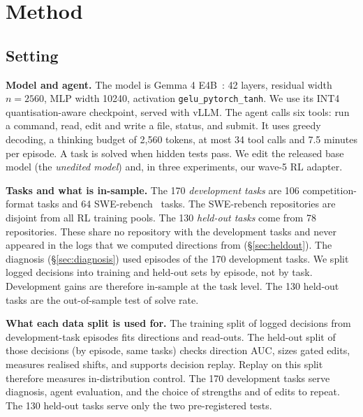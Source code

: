 \section{Method}
\label{sec:method}
\subsection{Setting}
\label{sec:setting}
\textbf{Model and agent.} The model is Gemma 4 E4B~\citep{Team2026Gemma4}: 42 layers, residual width $n = 2560$, MLP width 10240, activation \texttt{gelu\_pytorch\_tanh}. We use its INT4 quantisation-aware checkpoint, served with vLLM. The agent calls six tools: run a command, read, edit and write a file, status, and submit. It uses greedy decoding, a thinking budget of 2,560 tokens, at most 34 tool calls and 7.5 minutes per episode. A task is solved when hidden tests pass. We edit the released base model (the \emph{unedited model}) and, in three experiments, our wave-5 RL adapter.

\textbf{Tasks and what is in-sample.} The 170 \emph{development tasks} are 106 competition-format tasks and 64 SWE-rebench~\citep{Badertdinov2025Swerebench} tasks. The SWE-rebench repositories are disjoint from all RL training pools. The 130 \emph{held-out tasks} come from 78 repositories. These share no repository with the development tasks and never appeared in the logs that we computed directions from (\S\ref{sec:heldout}). The diagnosis (\S\ref{sec:diagnosis}) used episodes of the 170 development tasks. We split logged decisions into training and held-out sets by episode, not by task. Development gains are therefore in-sample at the task level. The 130 held-out tasks are the out-of-sample test of solve rate.

\textbf{What each data split is used for.} The training split of logged decisions from development-task episodes fits directions and read-outs. The held-out split of those decisions (by episode, same tasks) checks direction AUC, sizes gated edits, measures realised shifts, and supports decision replay. Replay on this split therefore measures in-distribution control. The 170 development tasks serve diagnosis, agent evaluation, and the choice of strengths and of edits to repeat. The 130 held-out tasks serve only the two pre-registered tests.

